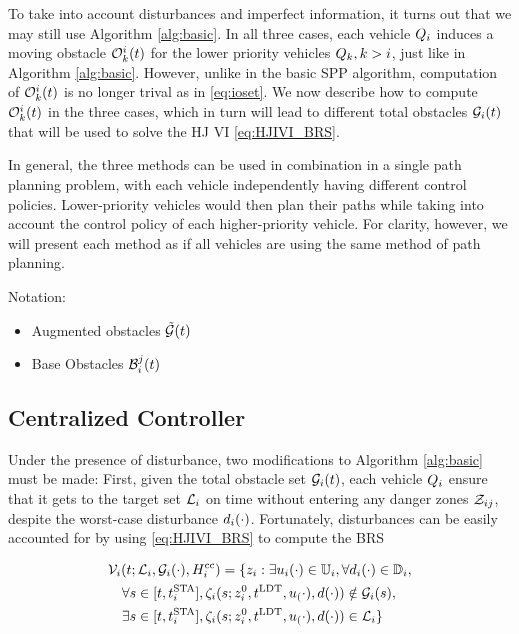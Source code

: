 To take into account disturbances and imperfect information, it turns out that we may still use Algorithm \ref{alg:basic}. In all three cases, each vehicle $Q_{i}$ induces a moving obstacle $\mathcal{O}_k^i(t)$ for the lower priority vehicles $Q_{k}, k>i$, just like in Algorithm \ref{alg:basic}. However, unlike in the basic SPP algorithm, computation of $\mathcal{O}_k^i(t)$ is no longer trival as in \eqref{eq:ioset}. We now describe how to compute $\mathcal{O}_k^i(t)$ in the three cases, which in turn will lead to different total obstacles $\mathcal{G}_i(t)$ that will be used to solve the HJ VI \eqref{eq:HJIVI_BRS}.

In general, the three methods can be used in combination in a single path planning problem, with each vehicle independently having different control policies. Lower-priority vehicles would then plan their paths while taking into account the control policy of each higher-priority vehicle. For clarity, however, we will present each method as if all vehicles are using the same method of path planning.

Notation:
\begin{itemize}
\item Augmented obstacles $\tilde{\mathcal{G}}(t)$
\item Base Obstacles $\mathcal{B}_i^j(t)$
\end{itemize}

\subsection{Centralized Controller} \label{sec:incomp_optctrl}
Under the presence of disturbance, two modifications to Algorithm \ref{alg:basic} must be made: First, given the total obstacle set $\mathcal{G}_i(t)$, each vehicle $Q_{i}$ ensure that it gets to the target set $\mathcal{L}_i$ on time without entering any danger zones $\mathcal{Z}_{ij}$, despite the worst-case disturbance $d_i(\cdot)$. Fortunately, disturbances can be easily accounted for by using \eqref{eq:HJIVI_BRS} to compute the BRS 

\begin{equation}
\label{eq:BRS_cc}
\begin{aligned}
&\brs_i(t; \targetset_i, \obsset_i(\cdot), \ccham_i) = \{\state_i: \exists \ctrl_i(\cdot) \in \cfset_i, \forall \dstb_i(\cdot) \in \dfset_i, \\
&\quad\forall s \in [t, \sta_i], \traj_i(s; \state^0_i, \ldt, \ctrl_(\cdot), \dstb(\cdot)) \notin \obsset_i(s), \\
&\quad\exists s \in [t, \sta_i], \traj_i(s; \state^0_i, \ldt, \ctrl_(\cdot), \dstb(\cdot)) \in \targetset_i\}
\end{aligned}
\end{equation}

